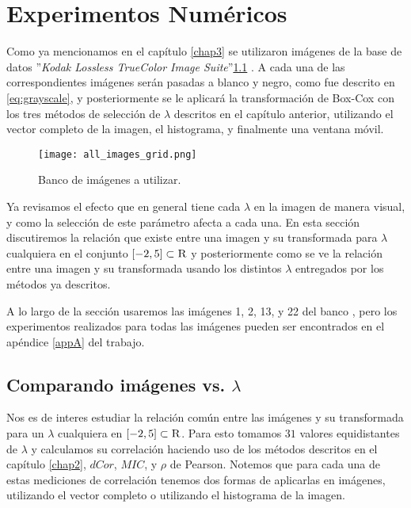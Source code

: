 \chapter{Experimentos Num\'ericos}\label{chap5}

    Como ya mencionamos en el cap\'itulo \ref{chap3} se utilizaron im\'agenes de la base de datos ''\textit{Kodak Lossless TrueColor Image Suite}''\ref{fig:rgb2gray_2} \cite{KodakLosslessTrueColorImageSuite}. A cada una de las correspondientes im\'agenes ser\'an pasadas a blanco y negro, como fue descrito en \ref{eq:grayscale}, y posteriormente se le aplicar\'a la transformaci\'on de Box-Cox con los tres m\'etodos de selecci\'on de $\lambda$ descritos en el cap\'itulo anterior, utilizando el vector completo de la imagen, el histograma, y finalmente una ventana m\'ovil.

    \begin{figure}[H]
        \centering
        \texttt{[image: all\_images\_grid.png]}
        \caption{Banco de im\'agenes a utilizar.}
        \label{fig:rgb2gray_2}
    \end{figure}
    
    Ya revisamos el efecto que en general tiene cada $\lambda$ en la imagen de manera visual, y como la selecci\'on de este par\'ametro afecta a cada una. En esta secci\'on discutiremos la relaci\'on que existe entre una imagen y su transformada para $\lambda$ cualquiera en el conjunto $[-2, 5]\subset\textsc{R}$ y posteriormente como se ve la relaci\'on entre una imagen y su transformada usando los distintos $\lambda$ entregados por los m\'etodos ya descritos.

    A lo largo de la secci\'on usaremos las im\'agenes 1, 2, 13, y 22 del banco \cite{KodakLosslessTrueColorImageSuite}, pero los experimentos realizados para todas las im\'agenes pueden ser encontrados en el ap\'endice \ref{appA} del trabajo. 
    

\section[Comparando im\'agenes vs. lambda]{Comparando im\'agenes vs. $\lambda$}

    Nos es de interes estudiar la relaci\'on com\'un entre las im\'agenes y su transformada para un $\lambda$ cualquiera en $[-2, 5]\subset\textsc{R}$. Para esto tomamos $31$ valores equidistantes de $\lambda$ y calculamos su correlaci\'on haciendo uso de los m\'etodos descritos en el cap\'itulo \ref{chap2}, $dCor$, $MIC$, y $\rho$ de Pearson. Notemos que para cada una de estas mediciones de correlaci\'on tenemos dos formas de aplicarlas en im\'agenes, utilizando el vector completo o utilizando el histograma de la imagen. 

